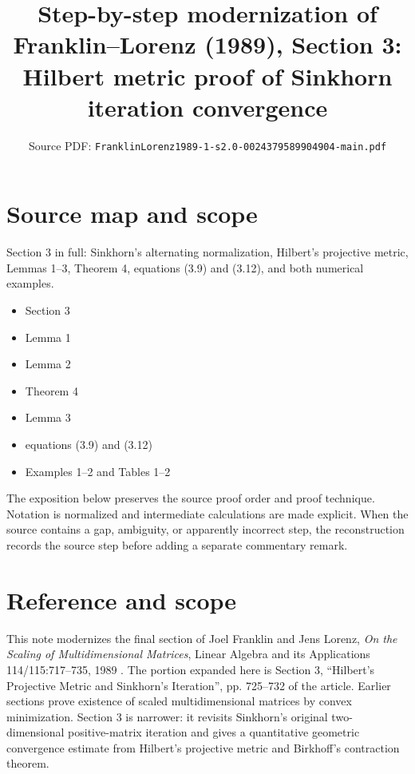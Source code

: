 

\title{Step-by-step modernization of Franklin--Lorenz (1989), Section 3: Hilbert metric proof of Sinkhorn iteration convergence}
\author{}
\date{Source PDF: \texttt{FranklinLorenz1989-1-s2.0-0024379589904904-main.pdf}}

\maketitle

\section*{Source map and scope}
\begin{description}[style=nextline,leftmargin=3.2cm,labelwidth=3cm]
\item[Primary source] \texttt{}
\item[Coverage] Section 3 in full: Sinkhorn's alternating normalization, Hilbert's projective metric, Lemmas 1--3, Theorem 4, equations (3.9) and (3.12), and both numerical examples.
\item[Source anchors]
\begin{itemize}[leftmargin=2em]
  \item Section 3
  \item Lemma 1
  \item Lemma 2
  \item Theorem 4
  \item Lemma 3
  \item equations (3.9) and (3.12)
  \item Examples 1--2 and Tables 1--2
\end{itemize}
\end{description}

The exposition below preserves the source proof order and proof technique.  Notation is normalized
and intermediate calculations are made explicit.  When the source contains a gap, ambiguity, or
apparently incorrect step, the reconstruction records the source step before adding a separate
commentary remark.

\section*{Reference and scope}
This note modernizes the final section of Joel Franklin and Jens Lorenz,
\emph{On the Scaling of Multidimensional Matrices}, Linear Algebra and its
Applications 114/115:717--735, 1989 \cite{FranklinLorenz1989}.  The portion
expanded here is Section 3, ``Hilbert's Projective Metric and Sinkhorn's
Iteration'', pp. 725--732 of the article.  Earlier sections prove existence of
scaled multidimensional matrices by convex minimization.  Section 3 is narrower:
it revisits Sinkhorn's original two-dimensional positive-matrix iteration and gives
a quantitative geometric convergence estimate from Hilbert's projective metric and
Birkhoff's contraction theorem.

